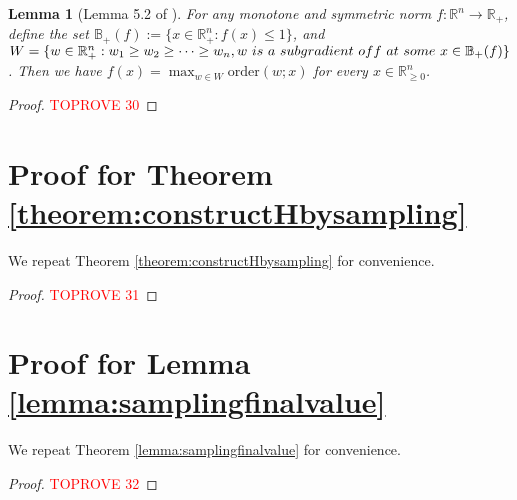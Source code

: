 \documentclass[11pt]{article}
\newtheorem{lemma}[theorem]{Lemma}
\newcommand{\order}{\mathrm{order}}
\begin{document}
\begin{CJK*}{UTF8}{gbsn}
\begin{lemma}[Lemma 5.2 of \cite{chakrabarty2019approximation}]\label{lem:Ordered2all}
    For any monotone and symmetric norm $f:\mathbb{R}^n\rightarrow \mathbb{R}_+$, define the set $\mathbb{B}_+(f):=\{x\in \mathbb{R}_+^n:f(x)\le 1\}$, and $W=\{w\in \mathbb{R}_+^n : w_1\ge w_2 \ge \cdots \ge w_n, w\ is\ a\ subgradient\ of\\ f\ at\ some\ x\in \mathbb{B}_+(f)\}$. Then we have $f(x)=\max_{w\in W} \order(w;x)$ for every $x\in \mathbb{R}_{\geq 0}^n$.
\end{lemma}

\lemmatopktolpnorm*
\begin{proof}\textcolor{red}{TOPROVE 30}\end{proof}
%
 
\section{Proof for Theorem \ref{theorem:constructHbysampling}}
\label{sec:constructH}
We repeat Theorem \ref{theorem:constructHbysampling} for convenience. 
\thmcnostructH*


\begin{proof}\textcolor{red}{TOPROVE 31}\end{proof} 
\section{Proof for Lemma \ref{lemma:samplingfinalvalue}}
\label{sec:proofofsamplingfinalvalue}
We repeat Theorem \ref{lemma:samplingfinalvalue} for convenience.
\lemmasmpaling*

\begin{proof}\textcolor{red}{TOPROVE 32}\end{proof} 





\end{CJK*}
\end{document}
